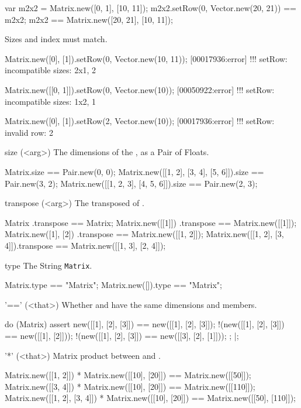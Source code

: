 \begin{urbiscriptapi}
\begin{urbiassert}
var m2x2 = Matrix.new([0, 1], [10, 11]);
m2x2.setRow(0, Vector.new(20, 21)) == m2x2;
m2x2 == Matrix.new([20, 21], [10, 11]);
\end{urbiassert}

  Sizes and index must match.
\begin{urbiscript}
Matrix.new([0], [1]).setRow(0, Vector.new(10, 11));
[00017936:error] !!! setRow: incompatible sizes: 2x1, 2

Matrix.new([[0, 1]]).setRow(0, Vector.new(10));
[00050922:error] !!! setRow: incompatible sizes: 1x2, 1

Matrix.new([0], [1]).setRow(2, Vector.new(10));
[00017936:error] !!! setRow: invalid row: 2
\end{urbiscript}


\item[size](<arg>)%
  The dimensions of the \this, as a Pair of Floats.
\begin{urbiassert}
Matrix.size == Pair.new(0, 0);
Matrix.new([[1, 2], [3, 4], [5, 6]]).size == Pair.new(3, 2);
Matrix.new([[1, 2, 3], [4, 5, 6]]).size == Pair.new(2, 3);
\end{urbiassert}

\item[transpose](<arg>)%
  The transposed of \this.
\begin{urbiassert}
Matrix                      .transpose == Matrix;
Matrix.new([[1]])           .transpose == Matrix.new([[1]]);
Matrix.new([1], [2])        .transpose == Matrix.new([[1, 2]]);
Matrix.new([[1, 2], [3, 4]]).transpose == Matrix.new([[1, 3], [2, 4]]);
\end{urbiassert}


\item[type]%
  The String \lstinline|Matrix|.
\begin{urbiassert}
Matrix.type         == "Matrix";
Matrix.new([]).type == "Matrix";
\end{urbiassert}


\item['=='](<that>)%
  Whether \this and \that have the same dimensions and members.
\begin{urbiscript}
do (Matrix)
{
  assert
  {
      new([[1], [2], [3]]) == new([[1], [2], [3]]);
    !(new([[1], [2], [3]]) == new([[1], [2]]));
    !(new([[1], [2], [3]]) == new([[3], [2], [1]]));
  };
}|;
\end{urbiscript}


\item['*'](<that>)%
  Matrix product between \this and \that.
\begin{urbiassert}
Matrix.new([[1, 2]]) * Matrix.new([[10], [20]])
  == Matrix.new([[50]]);
Matrix.new([[3, 4]]) * Matrix.new([[10], [20]])
  == Matrix.new([[110]]);
Matrix.new([[1, 2], [3, 4]]) * Matrix.new([[10], [20]])
  == Matrix.new([[50], [110]]);
\end{urbiassert}


\end{urbiscriptapi}
